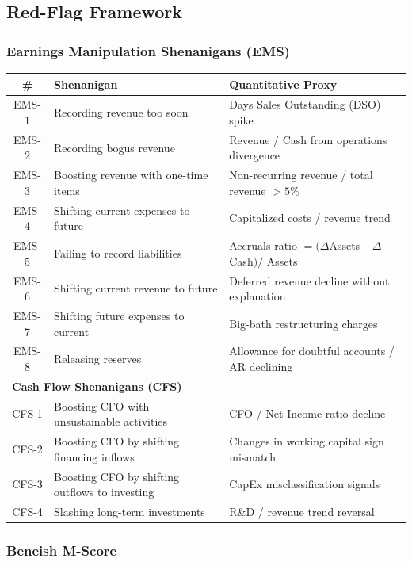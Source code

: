 \documentclass[12pt, a4paper]{article}
\begin{document}
\subsection{Red-Flag Framework}

\subsubsection{Earnings Manipulation Shenanigans (EMS)}

\begin{center}
\begin{tabularx}{\linewidth}{c X l}
  \toprule
  \textbf{\#} & \textbf{Shenanigan} & \textbf{Quantitative Proxy} \\
  \midrule
  EMS-1 & Recording revenue too soon & Days Sales Outstanding (DSO) spike \\
  EMS-2 & Recording bogus revenue & Revenue / Cash from operations divergence \\
  EMS-3 & Boosting revenue with one-time items & Non-recurring revenue / total revenue $> 5\%$ \\
  EMS-4 & Shifting current expenses to future & Capitalized costs / revenue trend \\
  EMS-5 & Failing to record liabilities & Accruals ratio $= (\Delta$Assets $- \Delta$Cash$) /$ Assets \\
  EMS-6 & Shifting current revenue to future & Deferred revenue decline without explanation \\
  EMS-7 & Shifting future expenses to current & Big-bath restructuring charges \\
  EMS-8 & Releasing reserves & Allowance for doubtful accounts / AR declining \\
  \midrule
  \multicolumn{3}{l}{\textbf{Cash Flow Shenanigans (CFS)}} \\
  \midrule
  CFS-1 & Boosting CFO with unsustainable activities & CFO / Net Income ratio decline \\
  CFS-2 & Boosting CFO by shifting financing inflows & Changes in working capital sign mismatch \\
  CFS-3 & Boosting CFO by shifting outflows to investing & CapEx misclassification signals \\
  CFS-4 & Slashing long-term investments & R\&D / revenue trend reversal \\
  \bottomrule
\end{tabularx}
\end{center}

\subsubsection{Beneish M-Score}
\end{document}
